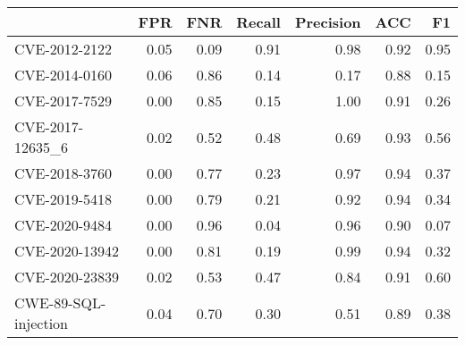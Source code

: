 \begin{tabular}{lrrrrrr}
\toprule
{} &  FPR &  FNR &  Recall &  Precision &  ACC &   F1 \\
\midrule
CVE-2012-2122        & 0.05 & 0.09 &    0.91 &       0.98 & 0.92 & 0.95 \\
CVE-2014-0160        & 0.06 & 0.86 &    0.14 &       0.17 & 0.88 & 0.15 \\
CVE-2017-7529        & 0.00 & 0.85 &    0.15 &       1.00 & 0.91 & 0.26 \\
CVE-2017-12635\_6     & 0.02 & 0.52 &    0.48 &       0.69 & 0.93 & 0.56 \\
CVE-2018-3760        & 0.00 & 0.77 &    0.23 &       0.97 & 0.94 & 0.37 \\
CVE-2019-5418        & 0.00 & 0.79 &    0.21 &       0.92 & 0.94 & 0.34 \\
CVE-2020-9484        & 0.00 & 0.96 &    0.04 &       0.96 & 0.90 & 0.07 \\
CVE-2020-13942       & 0.00 & 0.81 &    0.19 &       0.99 & 0.94 & 0.32 \\
CVE-2020-23839       & 0.02 & 0.53 &    0.47 &       0.84 & 0.91 & 0.60 \\
CWE-89-SQL-injection & 0.04 & 0.70 &    0.30 &       0.51 & 0.89 & 0.38 \\
\bottomrule
\end{tabular}
